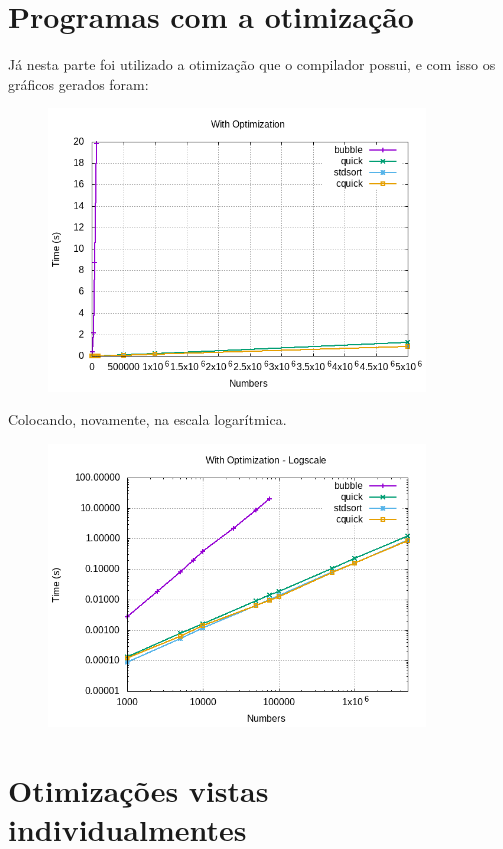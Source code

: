 \documentclass[a4paper, 12pt]{article}
\begin{document}
\vspace{0.75cm} %

\section{Programas com a otimização}

Já nesta parte foi utilizado a otimização que o compilador possui, e com isso os gráficos gerados foram:

\begin{figure}[H]
	\centering
	\includegraphics[width=10.0cm]{withOptimization.png}
\end{figure}

Colocando, novamente, na escala logarítmica.

\begin{figure}[H]
	\centering
	\includegraphics[width=10.0cm]{withOptimization_log.png}
\end{figure}


\section{Otimizações vistas individualmentes}
\end{document}
